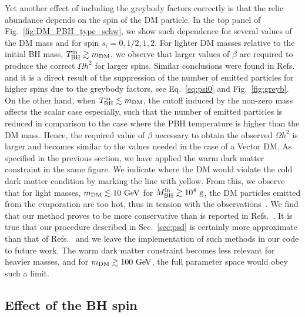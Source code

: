\documentclass[aps,prd,reprint,twocolumn,preprintnumbers,floatfix,nofootinbib]{revtex4-1}
\newcommand{\mDM}{m_{\rm DM}}
\newcommand{\MBH}{M_{\rm BH}}
\newcommand{\TBHi}{T_{\rm BH}^{\rm in}}
\newcommand{\GeV}{\rm GeV}
\newcommand{\g}{\rm g}
\begin{document}
Yet another effect of including the greybody factors correctly is that the relic abundance depends on the spin of the DM particle. In the top panel of Fig.~\ref{fig:DM_PBH_type_schw}, we show such dependence for several values of the DM mass and for spin $s_i=0,1/2,1,2$. For lighter DM masses relative to the initial BH mass, $\TBHi \gtrsim m_{\rm DM}$, we observe that larger values of $\beta$ are required to produce the correct $\Omega h^2$ for larger spins. Similar conclusions were found in Refs.~\cite{Lennon:2017tqq, Auffinger:2020afu} and it is a direct result of the suppression of the number of emitted particles for higher spins due to the greybody factors, see Eq.~\eqref{eq:psi0} and Fig.~\ref{fig:greyb}. On the other hand, when $\TBHi \lesssim m_{\rm DM}$, the cutoff induced by the non-zero mass affects the scalar case especially, such that the number of emitted particles is reduced in comparison to the case where the PBH temperature is higher than the DM mass. Hence, the required value of $\beta$ necessary to obtain the observed $\Omega h^2$ is larger and becomes similar to the values needed in the case of a Vector DM. As specified in the previous section, we have applied the warm dark matter constraint in the same figure. We indicate where the DM would violate the cold dark matter condition by marking the line with yellow. From this, we observe that for light masses, $\mDM \lesssim 10~\GeV$ for $\MBH^{\rm in}\gtrsim 10^4~\g$, the DM particles emitted from the evaporation are too hot, thus in tension with the observations~\cite{Baldes:2020nuv,Masina:2020xhk,Gondolo:2020uqv}. We find that our method proves to be more conservative than is reported in Refs.~\cite{Baldes:2020nuv,Masina:2020xhk,Gondolo:2020uqv,Auffinger:2020afu}. It is true that our procedure described in Sec.~\ref{sec:psd} is certainly more approximate than that of Refs.~\cite{Baldes:2020nuv, Auffinger:2020afu} and we leave the implementation of such methods in our code to future work. The warm dark matter constraint becomes less relevant for heavier masses, and for $\mDM \gtrsim 100~\GeV$, the full parameter space would obey such a limit. 

\subsection{Effect of the BH spin}
\end{document}
